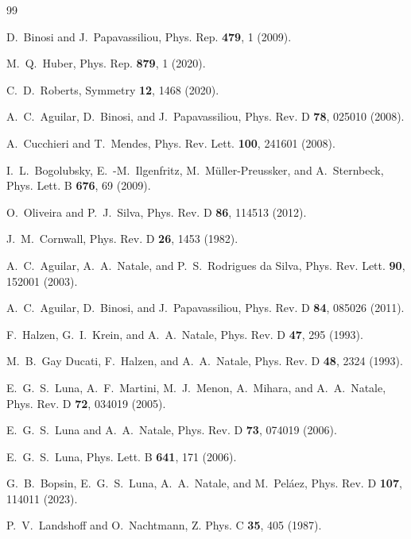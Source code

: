\documentclass[aps,prd,twocolumn,superscriptaddress,longbibliography,nofootinbib]{revtex4-2}
\begin{document}
\begin{thebibliography}{99}

 D.~Binosi and J.~Papavassiliou, Phys. Rep. \textbf{479}, 1 (2009).

 M.~Q.~Huber, Phys. Rep. \textbf{879}, 1 (2020).

 C.~D.~Roberts, Symmetry \textbf{12}, 1468 (2020).

 A.~C.~Aguilar, D.~Binosi, and J.~Papavassiliou, Phys. Rev. D \textbf{78}, 025010 (2008).

 A.~Cucchieri and T.~Mendes, Phys. Rev. Lett. \textbf{100}, 241601 (2008).

 I.~L.~Bogolubsky, E.~-M.~Ilgenfritz, M.~M\"uller-Preussker, and A.~Sternbeck, Phys. Lett. B \textbf{676}, 69 (2009).

 O.~Oliveira and P.~J.~Silva, Phys. Rev. D \textbf{86}, 114513 (2012).

 J.~M.~Cornwall, Phys. Rev. D \textbf{26}, 1453 (1982).

 A.~C.~Aguilar, A.~A.~Natale, and P.~S.~Rodrigues da Silva, Phys. Rev. Lett. \textbf{90}, 152001 (2003).

 A.~C.~Aguilar, D.~Binosi, and J.~Papavassiliou, Phys. Rev. D \textbf{84}, 085026 (2011).

 F.~Halzen, G.~I.~Krein, and A.~A.~Natale, Phys. Rev. D \textbf{47}, 295 (1993).

 M.~B.~Gay Ducati, F.~Halzen, and A.~A.~Natale, Phys. Rev. D \textbf{48}, 2324 (1993).

 E.~G.~S.~Luna, A.~F.~Martini, M.~J.~Menon, A.~Mihara, and A.~A.~Natale, Phys. Rev. D \textbf{72}, 034019 (2005).

 E.~G.~S.~Luna and A.~A.~Natale, Phys. Rev. D \textbf{73}, 074019 (2006).

 E.~G.~S.~Luna, Phys. Lett. B \textbf{641}, 171 (2006).

 G.~B.~Bopsin, E.~G.~S.~Luna, A.~A.~Natale, and M.~Pel\'aez, Phys. Rev. D \textbf{107}, 114011 (2023).

 P.~V.~Landshoff and O.~Nachtmann, Z. Phys. C \textbf{35}, 405 (1987).


\end{thebibliography}
\end{document}
